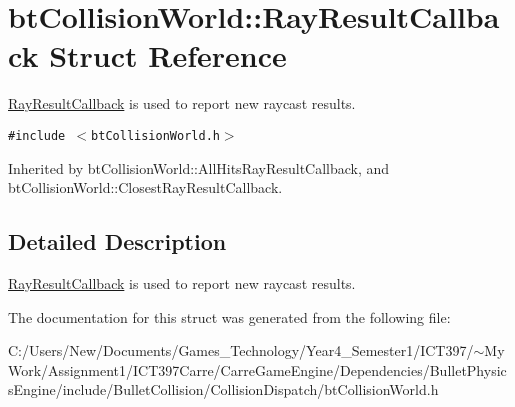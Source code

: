 \hypertarget{structbt_collision_world_1_1_ray_result_callback}{
\section{btCollisionWorld::RayResultCallback Struct Reference}
\label{structbt_collision_world_1_1_ray_result_callback}
}
\hyperlink{structbt_collision_world_1_1_ray_result_callback}{RayResultCallback} is used to report new raycast results.  


{\tt \#include $<$btCollisionWorld.h$>$}

Inherited by btCollisionWorld::AllHitsRayResultCallback, and btCollisionWorld::ClosestRayResultCallback.



\subsection{Detailed Description}
\hyperlink{structbt_collision_world_1_1_ray_result_callback}{RayResultCallback} is used to report new raycast results. 

The documentation for this struct was generated from the following file:\begin{CompactItemize}
\item 
C:/Users/New/Documents/Games\_\-Technology/Year4\_\-Semester1/ICT397/$\sim$My Work/Assignment1/ICT397Carre/CarreGameEngine/Dependencies/BulletPhysicsEngine/include/BulletCollision/CollisionDispatch/btCollisionWorld.h\end{CompactItemize}
